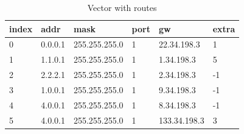 \documentclass[12pt,a4paper]{article}
\begin{document}
\begin{table}[float=tph]
\begin{center}
\begin{tabular}{|l|l|l|l|l|l|}
\hline index & addr & mask & port & gw & extra\\ 
\hline 0 & 0.0.0.1 & 255.255.255.0 & 1& 22.34.198.3 & 1\\ 
\hline 1 & 1.1.0.1 & 255.255.255.0 & 1& 1.34.198.3 & 5\\
\hline 2 & 2.2.2.1 & 255.255.255.0 & 1& 2.34.198.3 & -1\\
\hline 3 & 1.0.0.1 & 255.255.255.0 & 1& 9.34.198.3 & -1\\
\hline 4 & 4.0.0.1 & 255.255.255.0 & 1& 8.34.198.3 & -1\\
\hline 5 & 4.0.0.1 & 255.255.255.0 & 1& 133.34.198.3 & 3\\
\hline
\end{tabular}
\end{center}
\caption{Vector with routes}
\label{tbl:vector}
\end{table}
\end{document}
